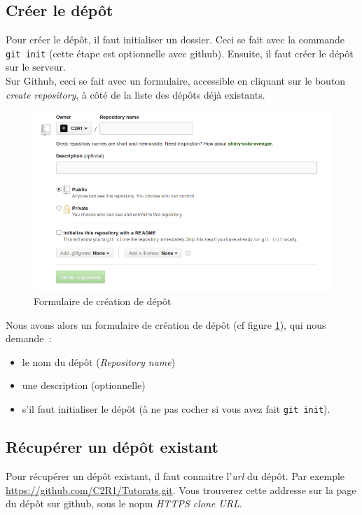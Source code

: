 \documentclass[a4paper,10pt]{report}
\begin{document}
    \subsection{Cr\'eer le d\'ep\^ot}
Pour cr\'eer le d\'ep\^ot, il faut initialiser un dossier. Ceci se fait avec la commande \verb|git init| (cette \'etape est optionnelle avec github). Ensuite, il faut cr\'eer le d\'ep\^ot sur le serveur.\\
Sur Github, ceci se fait avec un formulaire, accessible en cliquant sur le bouton \emph{create repository}, \`a c\^ot\'e de la liste des d\'ep\^ots d\'ej\`a existants.\\
\begin{figure}[h!]
  \begin{center}
    \includegraphics[scale=0.3]{images/createRepoForm}
    \caption{Formulaire de cr\'eation de d\'ep\^ot}
    \label{creationRepo}
  \end{center}
\end{figure}

Nous avons alors un formulaire de cr\'eation de d\'ep\^ot (cf figure \ref{creationRepo}), qui nous demande~:
\begin{itemize}
 \item le nom du d\'ep\^ot (\emph{Repository name})
 \item une description (optionnelle)
 \item s'il faut initialiser le d\'ep\^ot (\`a ne pas cocher si vous avez fait \verb|git init|).
\end{itemize}

    \subsection{R\'ecup\'erer un d\'ep\^ot existant}
Pour r\'ecup\'erer un d\'ep\^ot existant, il faut connaitre l'\emph{url} du d\'ep\^ot. Par exemple \url{https://github.com/C2R1/Tutorats.git}. Vous trouverez cette addresse sur la page du d\'ep\^ot sur github, sous le nopm \emph{HTTPS clone URL}.\\
\end{document}
